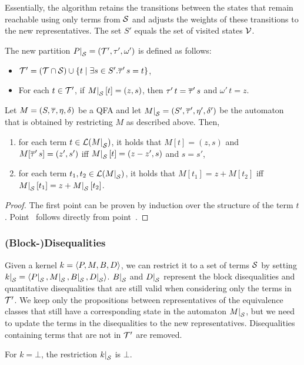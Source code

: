 Essentially, the algorithm retains the transitions between the states that remain reachable using only terms from $\mathcal{S}$ and adjusts the weights of these transitions to the new representatives.
The set $S'$ equals the set of visited states $\mathcal{V}$.

The new partition $\restr{P}{\Set} = (\T', \tau', \omega')$ is defined as follows:
\begin{itemize}
    \item $\mathcal{T}' = (\mathcal{T} \cap \mathcal{S}) \cup \{t \mid \exists s \in S' . \overline{\tau}'\,s = t\}$,
    \item For each $t \in \mathcal{T}'$, if $\restr{M}{\Set}[t] = (z, s)$, then $\tau'\,t = \overline{\tau}'\,s$ and $\omega'\,t = z$.
\end{itemize}

\begin{theorem}\label{restriction}
    Let $M = (S, \overline{\tau}, \eta, \delta)$ be a QFA and let $\restr{M}{\Set} = (S', \otau', \eta', \delta')$ be the automaton that is obtained by restricting $M$ as described above.
    Then,
    \begin{enumerate}
        \item\label{item:lemma-restriction} for each term $t \in \L(\restr{M}{\Set})$, it holds that $M[t] = (z, s)$ and $M[\overline{\tau}'\,s] = (z', s')$ iff $\restr{M}{\Set}[t] = (z - z', s)$ and $s = s'$,
              \item\label{item:correctness-restriction} for each term $t_1, t_2 \in \L(\restr{M}{\Set})$, it holds that $M[t_1] = z + M[t_2]$ iff $\restr{M}{\Set}[t_1] = z + \restr{M}{\Set}[t_2]$.
    \end{enumerate}
\end{theorem}
\begin{proof}
    The first point can be proven by induction over the structure of the term $t$.
    Point~ follows directly from point~.
\end{proof}

\subsubsection{(Block-)Disequalities}
Given a kernel $k = \langle P, M, B, D\rangle$, we can restrict it to a set of terms $\mathcal{S}$ by setting $\restr{k}{\Set} = \angl{\restr{P}{\Set}, \restr{M}{\Set}, \restr{B}{\Set}, \restr{D}{\Set}}$.
$\restr{B}{\Set}$ and $\restr{D}{\Set}$ represent the block disequalities and quantitative disequalities that are still valid when considering only the terms in $\mathcal{T}'$.
We keep only the propositions between representatives of the equivalence classes that
still have a corresponding state in the automaton $\restr{M}{\Set}$, but we need to update the terms in the disequalities to the new representatives.
Disequalities containing terms that are not in $\mathcal{T}'$ are removed.

For $k = \bot$, the restriction $\restr{k}{\Set}$ is $\bot$.

